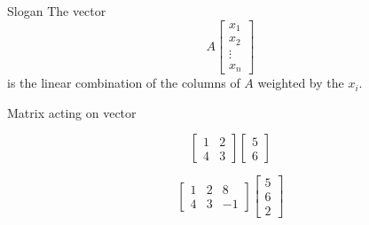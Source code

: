 \documentclass{beamer}
\begin{document}
\begin{frame}{Slogan}
  The vector
  \begin{equation*}
    A \left[\begin{array}{c} x_1 \\ x_2 \\ \vdots \\ x_n\end{array} \right]
  \end{equation*}
  is the linear combination of the columns of $A$ weighted by the $x_i$.
\end{frame}

\begin{frame}{Matrix acting on vector}
  \begin{example}
    \begin{equation*}
      \left[\begin{array}{cc}
          1 & 2 \\
          4 & 3
        \end{array}\right]
      \left[\begin{array}{c}
          5 \\
          6
        \end{array}\right]
    \end{equation*}
  \end{example}
  \begin{example}
    \begin{equation*}
      \left[\begin{array}{ccc}
          1 & 2 & 8 \\
          4 & 3 & -1
        \end{array}\right]
      \left[\begin{array}{c}
          5 \\
          6 \\
          2
        \end{array}\right]
    \end{equation*}
  \end{example}
\end{frame}
\end{document}
